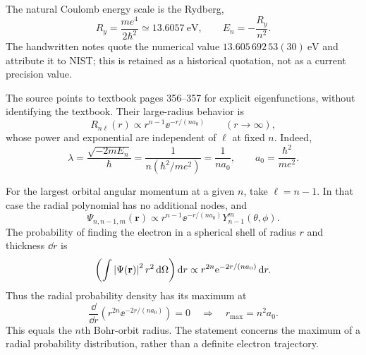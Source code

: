 The natural Coulomb energy scale is the Rydberg,
\[
 R_y=\frac{me^4}{2\hbar^2}\simeq13.6057\ \mathrm{eV},\qquad
 E_n=-\frac{R_y}{n^2}.
\]
The handwritten notes quote the numerical value
$13.605\,692\,53(30)\ \mathrm{eV}$ and attribute it to NIST; this is
retained as a historical quotation, not as a current precision value.

The source points to textbook pages 356--357 for explicit
eigenfunctions, without identifying the textbook. Their large-radius
behavior is
\[
 R_{n\ell}(r)\propto r^{n-1}\ee^{-r/(na_0)}\qquad(r\to\infty),
\]
whose power and exponential are independent of $\ell$ at fixed $n$.
Indeed,
\[
 \lambda=\frac{\sqrt{-2mE_n}}{\hbar}
 =\frac{1}{n(\hbar^2/me^2)}=\frac1{na_0},\qquad
 a_0=\frac{\hbar^2}{me^2}.
\]

For the largest orbital angular momentum at a given $n$, take
$\ell=n-1$. In that case the radial polynomial has no additional
nodes, and
\[
 \Psi_{n,n-1,m}(\mathbf r)\propto
 r^{n-1}\ee^{-r/(na_0)}Y_{n-1}^{m}(\theta,\phi).
\]
The probability of finding the electron in a spherical shell of radius
$r$ and thickness $\dd r$ is
\[
 \left(\int\left\lvert\Psi(\mathbf r)\right\rvert^2r^2\mathop{}\!\mathrm{d}\Omega\right)\mathop{}\!\mathrm{d} r
 \propto r^{2n}\mathrm{e}^{-2r/(na_0)}\mathop{}\!\mathrm{d} r.
\]
Thus the radial probability density has its maximum at
\[
 \frac\dd{\dd r}\left(r^{2n}\ee^{-2r/(na_0)}\right)=0
 \quad\Longrightarrow\quad
 \boxed{r_{\max}=n^2a_0.}
\]
This equals the $n$th Bohr-orbit radius. The statement concerns the
maximum of a radial probability distribution, rather than a definite
electron trajectory.
